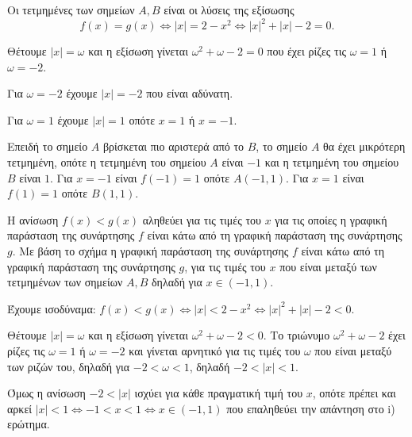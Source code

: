 
\begin{alist}
\item Οι τετμημένες των σημείων $A, B$ είναι οι λύσεις της εξίσωσης
\[f(x) = g(x) \Leftrightarrow |x| = 2 - x^2 \Leftrightarrow |x|^2 + |x| - 2 = 0.\]

Θέτουμε $|x| = \omega$ και η εξίσωση γίνεται $\omega^2 + \omega - 2 = 0$ που έχει ρίζες τις $\omega = 1$ ή $\omega = -2$.

Για $\omega = -2$ έχουμε $|x| = -2$ που είναι αδύνατη.

Για $\omega = 1$ έχουμε $|x| = 1$ οπότε $x = 1$ ή $x = -1$.

Επειδή το σημείο $A$ βρίσκεται πιο αριστερά από το $B$, το σημείο $A$ θα έχει μικρότερη
τετμημένη, οπότε η τετμημένη του σημείου $A$ είναι $-1$ και η τετμημένη του σημείου $B$
είναι $1$.
Για $x = -1$ είναι $f(-1) = 1$ οπότε $A(-1, 1)$.
Για $x = 1$ είναι $f(1) = 1$ οπότε $B(1, 1)$.

\item 
\begin{rlist}
\item Η ανίσωση $f(x) < g(x)$ αληθεύει για τις τιμές του $x$ για τις οποίες η γραφική
παράσταση της συνάρτησης $f$ είναι κάτω από τη γραφική παράσταση της συνάρτησης
$g$. Με βάση το σχήμα η γραφική παράσταση της συνάρτησης $f$ είναι κάτω από τη
γραφική παράσταση της συνάρτησης $g$, για τις τιμές του $x$ που είναι μεταξύ των
τετμημένων των σημείων $A, B$ δηλαδή για $x \in (-1, 1)$.

\item Έχουμε ισοδύναμα: $f(x) < g(x) \Leftrightarrow |x| < 2 - x^2 \Leftrightarrow |x|^2 + |x| - 2 < 0$.

Θέτουμε $|x| = \omega$ και η εξίσωση γίνεται $\omega^2 + \omega - 2 < 0$. Το τριώνυμο $\omega^2 + \omega - 2$ έχει ρίζες
τις $\omega = 1$ ή $\omega = -2$ και γίνεται αρνητικό για τις τιμές του $\omega$ που είναι μεταξύ των ριζών
του, δηλαδή για $-2 < \omega < 1$, δηλαδή $-2 < |x| < 1$.

Όμως η ανίσωση $-2 < |x|$ ισχύει για κάθε πραγματική τιμή του $x$, οπότε πρέπει και
αρκεί $|x| < 1 \Leftrightarrow -1 < x < 1 \Leftrightarrow x \in (-1, 1)$ που επαληθεύει την απάντηση στο i) ερώτημα.
\end{rlist}
\end{alist}

